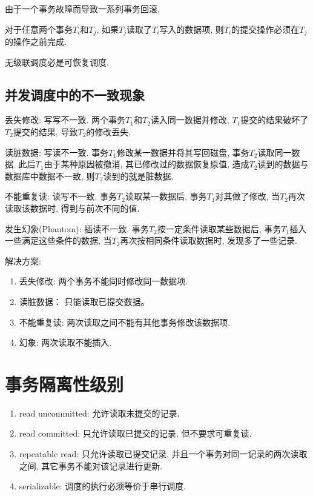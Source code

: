 \begin{definition}[级联调度]
  由于一个事务故障而导致一系列事务回滚.
\end{definition}

\begin{definition}[无级连调度]
  对于任意两个事务$T_i$和$T_j$, 如果$T_j$读取了$T_i$写入的数据项, 则$T_i$的提交操作必须在$T_j$的操作之前完成.

  无级联调度必是可恢复调度.
\end{definition}

\subsection{并发调度中的不一致现象}

丢失修改: 写写不一致. 两个事务$T_1$和$T_2$读入同一数据并修改, 
$T_1$提交的结果破坏了$T_2$提交的结果, 导致$T_2$的修改丢失.

读脏数据: 写读不一致. 事务$T_1$修改某一数据并将其写回磁盘, 
事务$T_2$读取同一数据. 
此后$T_1$由于某种原因被撤消, 其已修改过的数据恢复原值, 
造成$T_2$读到的数据与数据库中数据不一致, 则$T_2$读到的就是脏数据.

不能重复读: 读写不一致. 事务$T_2$读取某一数据后, 事务$T_1$对其做了修改, 
当$T_2$再次读取该数据时, 得到与前次不同的值.

发生幻象(Phantom): 插读不一致. 事务$T_2$按一定条件读取某些数据后, 
事务$T_1$插入一些满足这些条件的数据, 
当$T_2$再次按相同条件读取数据时, 发现多了一些记录.

解决方案:
\begin{enumerate}
    \item 丢失修改: 两个事务不能同时修改同一数据项.
    \item 读脏数据： 只能读取已提交数据。
    \item 不能重复读: 两次读取之间不能有其他事务修改该数据项.
    \item 幻象: 两次读取不能插入.
\end{enumerate}

\section{事务隔离性级别}

\begin{enumerate}
    \item read uncommitted: 允许读取未提交的记录.
    \item read committed: 只允许读取已提交的记录, 但不要求可重复读.
    \item repeatable read: 只允许读取已提交记录, 并且一个事务对同一记录的两次读取之间, 其它事务不能对该记录进行更新.
    \item serializable: 调度的执行必须等价于串行调度.
\end{enumerate}

